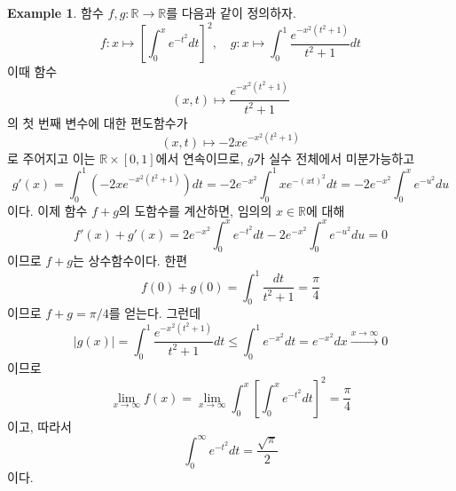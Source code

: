 \documentclass[11pt]{book}
\numberwithin{equation}{chapter}
\def\RR{\mathbb{R}}
\newcommand{\abs}[1]{\left\vert#1\right\vert}
\newcommand{\sqbracket}[1]{\left[#1\right]}
\theoremstyle{definition}
\newtheorem*{ex}{Example}
\begin{document}
\begin{ex}
    함수 \(f, g : \RR \to \RR\)를 다음과 같이 정의하자.
    \[
    f :x \mapsto \sqbracket{\int_0^x e^{-t^2} dt}^2, \quad g : x \mapsto \int_0^1 \frac{e^{-x^2(t^2+1)}}{t^2+1} dt
    \]
    이때 함수
    \[
    (x, t) \mapsto \frac{e^{-x^2(t^2+1)}}{t^2+1}    
    \]
    의 첫 번째 변수에 대한 편도함수가
    \[
    (x, t) \mapsto -2x e^{-x^2(t^2+1)}    
    \]
    로 주어지고 이는 \(\RR \times [0, 1]\)에서 연속이므로, \(g\)가 실수 전체에서 미분가능하고
    \[
    g'(x) = \int_0^1 (-2x e^{-x^2(t^2+1)}) dt = -2e^{-x^2} \int_0^1 xe^{-(xt)^2} dt = -2e^{-x^2} \int_0^x e^{-u^2} du
    \]
    이다. 이제 함수 \(f + g\)의 도함수를 계산하면, 임의의 \(x \in \RR\)에 대해
    \[
    f'(x) + g'(x) = 2e^{-x^2} \int_0^x e^{-t^2}dt -2e^{-x^2} \int_0^x e^{-u^2} du = 0    
    \]
    이므로 \(f + g\)는 상수함수이다. 한편
    \[
    f(0) + g(0) = \int_0^1 \frac{dt}{t^2 + 1} = \frac{\pi}{4}    
    \]
    이므로 \(f+g = \pi/4\)를 얻는다. 그런데
    \[
    \abs{g(x)} = \int_0^1 \frac{e^{-x^2(t^2+1)}}{t^2+1} dt \le \int_0^1 e^{-x^2} dt = e^{-x^2} dx \xrightarrow[]{x \to \infty} 0
    \]
    이므로
    \[
    \lim_{x \to \infty} f(x) = \lim_{x \to \infty} \int_0^x \sqbracket{\int_0^x e^{-t^2} dt}^2 = \frac{\pi}{4}    
    \]
    이고, 따라서
    \[
    \int_0^{\infty} e^{-t^2} dt = \frac{\sqrt{\pi}}{2}    
    \]
    이다.
\end{ex}
\end{document}
